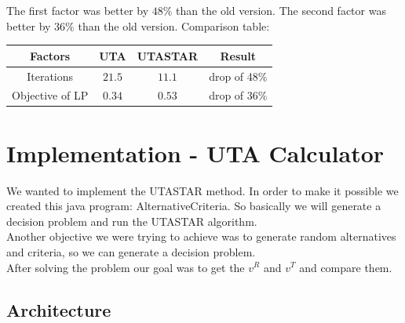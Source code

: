 \documentclass{report}
\begin{document}
The first factor was better by $48\%$ than the old version. The second factor was better by $36\%$ than the old version. 
Comparison table:

\begin{center}
 \begin{tabular}{| c | c | c | c |} 
 \hline
 Factors & UTA & UTASTAR & Result \\
 \hline
Iterations & $21.5$ & $11.1$ & drop of 48\% \\ 
 \hline
Objective of LP & $0.34$ & $0.53$ & drop of 36\%\\ 
 \hline
\end{tabular}
\end{center}

 


\newpage
\section{Implementation - UTA Calculator}
We wanted to implement the UTASTAR method. In order to make it possible we created this java program: AlternativeCriteria. So basically we will generate a decision problem and run the UTASTAR algorithm. \\
Another objective we were trying to achieve was to generate random alternatives and criteria, so we can generate a decision problem. \\
After solving the problem our goal was to get the $v^{R}$ and $v^{T}$ and compare them. 
\subsection{Architecture}
\end{document}
